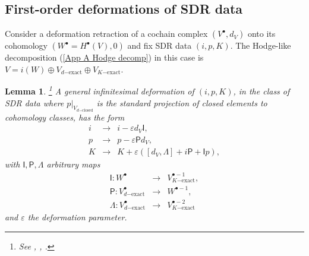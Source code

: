 \documentclass[11pt,a4paper]{amsart}
\theoremstyle{plain} %
\newtheorem{lem}[thm]{Lemma}
\theoremstyle{definition}
\theoremstyle{remark}
\newcommand{\mr}{\mathrm}
\newcommand{\bt}{\bullet}
\newcommand{\ra}{\rightarrow}
\begin{document}
\subsection{First-order deformations of SDR data}
Consider a deformation retraction of a cochain complex $(V^\bt,d_V)$ onto its cohomology $(W^\bt=H^\bt(V),0)$ and fix SDR data $(i,p,K)$. The Hodge-like decomposition (\ref{App A Hodge decomp}) in this case is
$V=i(W)\oplus V_{d\mr{-exact}}\oplus V_{K\mr{-exact}}$.
\begin{lem}\footnote{See \cite{Mnev2008}, \cite{Cattaneo2008}, \cite{cattaneo2020cellular}.} \label{lem: SDR deformations}
    A general infinitesimal deformation of $(i,p,K)$, in the class of SDR data where $p|_{V_{d\mr{-closed}}}$ is the standard projection of closed elements to cohomology classes, has the form
    \begin{eqnarray}
        i & \ra & i-\varepsilon d_V \mathsf{I} , \\
        p & \ra & p-  \varepsilon \mathsf{P} d_V, \\
        K &\ra & K+\varepsilon ([d_V,\Lambda] + i\mathsf{P} +\mathsf{I}  p),
    \end{eqnarray}
    with $\mathsf{I},\mathsf{P},\Lambda$ arbitrary maps
    \begin{eqnarray}
        \mathsf{I}\colon W^\bt
        &\ra& V^{\bt-1}_{K\mr{-exact}},\\
         \mathsf{P}\colon V^\bt_{d\mr{-exact}}&\ra& W^{\bt-1},\\
         \Lambda\colon V^\bt_{d\mr{-exact}} &\ra& V^{\bt-2}_{K\mr{-exact}}
    \end{eqnarray}
    and $\varepsilon$ the deformation parameter.
\end{lem}
\end{document}
